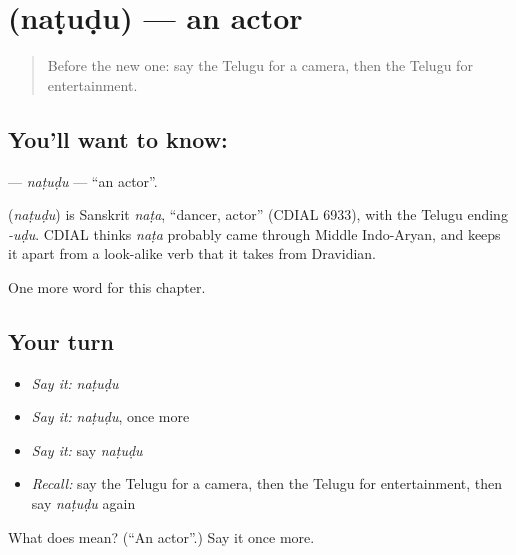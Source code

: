 \section[\texorpdfstring{\te{నటుడు} (naṭuḍu)}{నటుడు (naṭuḍu)}]{ (naṭuḍu) — an actor}

\label{lesson:TE-C230-natudu}



\begin{quote}
Before the new one: say the Telugu for a camera, then the Telugu for entertainment.
\end{quote}

\subsection*{You'll want to know: }
\textbf{} — \emph{naṭuḍu} — \textquotedblleft{}an actor\textquotedblright{}.

\begin{cousinweb}
\textbf{} (\emph{naṭuḍu}) is Sanskrit \emph{naṭa}, \textquotedblleft{}dancer, actor\textquotedblright{} (CDIAL 6933), with the Telugu ending \emph{-uḍu}. CDIAL thinks \emph{naṭa} probably came through Middle Indo-Aryan, and keeps it apart from a look-alike verb that it takes from Dravidian.
\end{cousinweb}

\begin{grammarlens}[title={What you've built}]
One more word for this chapter.
\end{grammarlens}

\subsection*{Your turn}
\begin{itemize}
\raggedright
  \item \emph{Say it:} \emph{naṭuḍu}
  \item \emph{Say it:} \emph{naṭuḍu}, once more
  \item \emph{Say it:} say \emph{naṭuḍu}
  \item \emph{Recall:} say the Telugu for a camera, then the Telugu for entertainment, then say \emph{naṭuḍu} again
\end{itemize}

\begin{tcolorbox}[breakable,colback=teal!4,colframe=teal!35!black,title={Before you move on}]
What does  mean? (\textquotedblleft{}An actor\textquotedblright{}.) Say it once more.
\end{tcolorbox}
